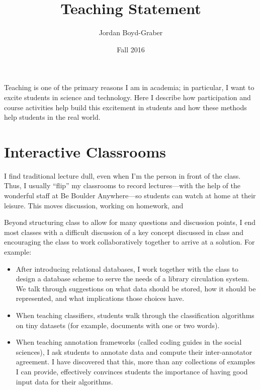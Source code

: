 \documentclass[11pt]{amsart}
\begin{document}
 \title{Teaching Statement}

 \author{Jordan Boyd-Graber}
\address{University of Colorado}

\date{Fall 2016}


\keywords{}

\maketitle

Teaching is one of the primary reasons I am in academia; in particular, I want
to excite students in science and technology. Here I describe how
participation and course activities help build this excitement in students and
how these methods help students in the real world.

\section{Interactive Classrooms}

I find traditional lecture dull, even when I'm the person in front of
the class.  Thus, I usually ``flip'' my classrooms to record
lectures---with the help of the wonderful staff at Be Boulder
Anywhere---so students can watch at home at their leisure.  This moves
discussion, working on homework, and

Beyond structuring class to allow for many questions and discussion
points, I end most classes with a difficult discussion of a key
concept discussed in class and encouraging the class to work
collaboratively together to arrive at a solution.  For example:
\begin{itemize}
  \item After introducing relational databases, I work together with the class to
design a database scheme to serve the needs of a library circulation
system.  We talk through suggestions on what data should be stored,
how it should be represented, and what implications those choices
have.
  \item When teaching classifiers, students walk through the classification
    algorithms on tiny datasets (for example, documents with one or two words).
  \item When teaching annotation frameworks (called coding guides in the
    social sciences), I ask students to annotate data and
    compute their inter-annotator agreement.  I have discovered that this, more
    than any collections of examples I can provide, effectively convinces
    students the importance of having good input data for their algorithms.
\end{itemize}
\end{document}
